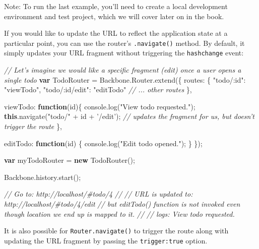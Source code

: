 \documentclass[9pt]{book}
\newenvironment{Shaded}{}{}
\newcommand{\KeywordTok}[1]{\textcolor[rgb]{0.00,0.44,0.13}{\textbf{{#1}}}}
\newcommand{\DataTypeTok}[1]{\textcolor[rgb]{0.56,0.13,0.00}{{#1}}}
\newcommand{\StringTok}[1]{\textcolor[rgb]{0.25,0.44,0.63}{{#1}}}
\newcommand{\CommentTok}[1]{\textcolor[rgb]{0.38,0.63,0.69}{\textit{{#1}}}}
\newcommand{\OtherTok}[1]{\textcolor[rgb]{0.00,0.44,0.13}{{#1}}}
\newcommand{\FunctionTok}[1]{\textcolor[rgb]{0.02,0.16,0.49}{{#1}}}
\newcommand{\NormalTok}[1]{{#1}}
\begin{document}
Note: To run the last example, you'll need to create a local development
environment and test project, which we will cover later on in the book.

If you would like to update the URL to reflect the application state at
a particular point, you can use the router's \texttt{.navigate()}
method. By default, it simply updates your URL fragment without
triggering the \texttt{hashchange} event:

\begin{Shaded}
\begin{Highlighting}[]
\CommentTok{// Let's imagine we would like a specific fragment (edit) once a user opens a single todo}
\KeywordTok{var} \NormalTok{TodoRouter = }\OtherTok{Backbone}\NormalTok{.}\OtherTok{Router}\NormalTok{.}\FunctionTok{extend}\NormalTok{(\{}
  \DataTypeTok{routes}\NormalTok{: \{}
    \StringTok{"todo/:id"}\NormalTok{: }\StringTok{"viewTodo"}\NormalTok{,}
    \StringTok{"todo/:id/edit"}\NormalTok{: }\StringTok{"editTodo"}
    \CommentTok{// ... other routes}
  \NormalTok{\},}

  \DataTypeTok{viewTodo}\NormalTok{: }\KeywordTok{function}\NormalTok{(id)\{}
    \OtherTok{console}\NormalTok{.}\FunctionTok{log}\NormalTok{(}\StringTok{"View todo requested."}\NormalTok{);}
    \KeywordTok{this}\NormalTok{.}\FunctionTok{navigate}\NormalTok{(}\StringTok{"todo/"} \NormalTok{+ id + }\StringTok{'/edit'}\NormalTok{); }\CommentTok{// updates the fragment for us, but doesn't trigger the route}
  \NormalTok{\},}

  \DataTypeTok{editTodo}\NormalTok{: }\KeywordTok{function}\NormalTok{(id) \{}
    \OtherTok{console}\NormalTok{.}\FunctionTok{log}\NormalTok{(}\StringTok{"Edit todo opened."}\NormalTok{);}
  \NormalTok{\}}
\NormalTok{\});}

\KeywordTok{var} \NormalTok{myTodoRouter = }\KeywordTok{new} \FunctionTok{TodoRouter}\NormalTok{();}

\OtherTok{Backbone}\NormalTok{.}\OtherTok{history}\NormalTok{.}\FunctionTok{start}\NormalTok{();}

\CommentTok{// Go to: http://localhost/#todo/4}
\CommentTok{//}
\CommentTok{// URL is updated to: http://localhost/#todo/4/edit}
\CommentTok{// but editTodo() function is not invoked even though location we end up is mapped to it.}
\CommentTok{//}
\CommentTok{// logs: View todo requested.}
\end{Highlighting}
\end{Shaded}

It is also possible for \texttt{Router.navigate()} to trigger the route
along with updating the URL fragment by passing the
\texttt{trigger:true} option.
\end{document}

